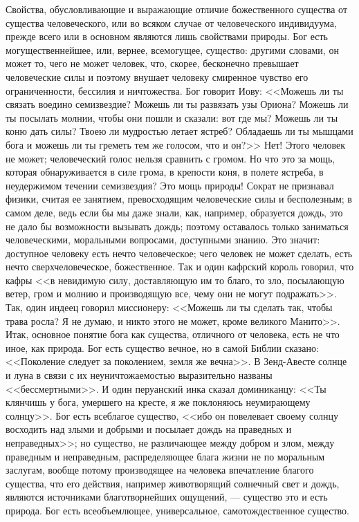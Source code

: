 \documentclass[12pt]{article}
\begin{document}
Свойства, обусловливающие и выражающие отличие божественного существа от существа человеческого, или во всяком случае от человеческого индивидуума, прежде всего или в основном являются лишь свойствами природы. Бог есть могущественнейшее, или, вернее, всемогущее, существо: другими словами, он может то, чего не может человек, что, скорее, бесконечно превышает человеческие силы и поэтому внушает человеку смиренное чувство его ограниченности, бессилия и ничтожества. Бог говорит Иову: <<Можешь ли ты связать воедино семизвездие? Можешь ли ты развязать узы Ориона? Можешь ли ты посылать молнии, чтобы они пошли и сказали: вот где мы? Можешь ли ты коню дать силы? Твоею ли мудростью летает ястреб? Обладаешь ли ты мышцами бога и можешь ли ты греметь тем же голосом, что и он?>> Нет! Этого человек не может; человеческий голос нельзя сравнить с громом. Но что это за мощь, которая обнаруживается в силе грома, в крепости коня, в полете ястреба, в неудержимом течении семизвездия? Это мощь природы! Сократ не признавал физики, считая ее занятием, превосходящим человеческие силы и бесполезным; в самом деле, ведь если бы мы даже знали, как, например, образуется дождь, это не дало бы возможности вызывать дождь; поэтому оставалось только заниматься человеческими, моральными вопросами, доступными знанию. Это значит: доступное человеку есть нечто человеческое; чего человек не может сделать, есть нечто сверхчеловеческое, божественное. Так и один кафрский король говорил, что кафры << в невидимую силу, доставляющую им то благо, то зло, посылающую ветер, гром и молнию и производящую все, чему они не могут подражать>>. Так, один индеец говорил миссионеру: <<Можешь ли ты сделать так, чтобы трава росла? Я не думаю, и никто этого не может, кроме великого Манито>>. Итак, основное понятие бога как существа, отличного от человека, есть не что иное, как природа. Бог есть существо вечное, но в самой Библии сказано: <<Поколение следует за поколением, земля же вечна>>. В Зенд-Авесте солнце и луна в связи с их неуничтожаемостью выразительно названы <<бессмертными>>. И один перуанский инка сказал доминиканцу: <<Ты клянчишь у бога, умершего на кресте, я же поклоняюсь неумирающему солнцу>>. Бог есть всеблагое существо, <<ибо он повелевает своему солнцу восходить над злыми и добрыми и посылает дождь на праведных и неправедных>>; но существо, не различающее между добром и злом, между праведным и неправедным, распределяющее блага жизни не по моральным заслугам, вообще потому производящее на человека впечатление благого существа, что его действия, например животворящий солнечный свет и дождь, являются источниками благотворнейших ощущений, --- существо это и есть природа. Бог есть всеобъемлющее, универсальное, самотождественное существо.
\end{document}
